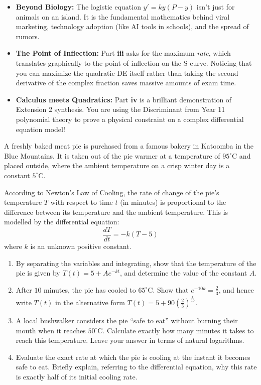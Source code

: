 \begin{takeaways}
\begin{itemize}[leftmargin=*]
    \item \textbf{Beyond Biology:} The logistic equation $y' = ky(P-y)$ isn't just for animals on an island. It is the fundamental mathematics behind viral marketing, technology adoption (like AI tools in schools), and the spread of rumors.
    \item \textbf{The Point of Inflection:} Part \textbf{iii} asks for the maximum \textit{rate}, which translates graphically to the point of inflection on the S-curve. Noticing that you can maximize the quadratic DE itself rather than taking the second derivative of the complex fraction saves massive amounts of exam time.
    \item \textbf{Calculus meets Quadratics:} Part \textbf{iv} is a brilliant demonstration of Extension 2 synthesis. You are using the Discriminant from Year 11 polynomial theory to prove a physical constraint on a complex differential equation model!
\end{itemize}
\end{takeaways}

\begin{problem}
A freshly baked meat pie is purchased from a famous bakery in Katoomba in the Blue Mountains. It is taken out of the pie warmer at a temperature of $95^\circ\text{C}$ and placed outside, where the ambient temperature on a crisp winter day is a constant $5^\circ\text{C}$. 

According to Newton's Law of Cooling, the rate of change of the pie's temperature $T$ with respect to time $t$ (in minutes) is proportional to the difference between its temperature and the ambient temperature. This is modelled by the differential equation:
\[ \frac{dT}{dt} = -k(T - 5) \]
where $k$ is an unknown positive constant.

\begin{enumerate}
    \item[\textbf{i}] By separating the variables and integrating, show that the temperature of the pie is given by $T(t) = 5 + A e^{-kt}$, and determine the value of the constant $A$.
    \item[\textbf{ii}] After $10$ minutes, the pie has cooled to $65^\circ\text{C}$. Show that $e^{-10k} = \frac{2}{3}$, and hence write $T(t)$ in the alternative form $T(t) = 5 + 90 \left(\frac{2}{3}\right)^{\frac{t}{10}}$.
    \item[\textbf{iii}] A local bushwalker considers the pie ``safe to eat'' without burning their mouth when it reaches $50^\circ\text{C}$. Calculate exactly how many minutes it takes to reach this temperature. Leave your answer in terms of natural logarithms.
    \item[\textbf{iv}] Evaluate the exact rate at which the pie is cooling at the instant it becomes safe to eat. Briefly explain, referring to the differential equation, why this rate is exactly half of its initial cooling rate.
\end{enumerate}
\end{problem}


